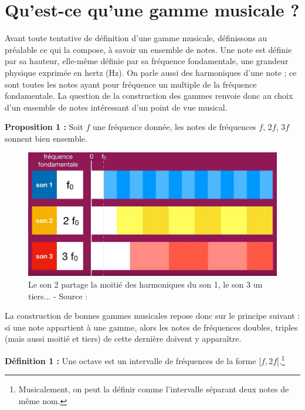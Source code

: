 \documentclass[moyen]{classeUPD}
\newenvironment{definition}{
	\begin{lrbox}{\tempbox}
		\begin{minipage}{\textwidth}
		}{
		\end{minipage}
	\end{lrbox}
	\begin{center}
		\fcolorbox[HTML]{222222}{EEEEEE}{
			\usebox{\tempbox}
		}
	\end{center}
}
\newcommand{\emf}[1]{\textbf{#1}}
\begin{document}
\chapter{Qu’est-ce qu’une gamme musicale ?}

Avant toute tentative de définition d’une gamme musicale, définissons au préalable ce qui la compose, à savoir un ensemble de notes. Une note est définie par sa hauteur, elle-même définie par sa fréquence fondamentale, une grandeur physique exprimée en hertz (Hz). On parle aussi des harmoniques d'une note ; ce sont toutes les notes ayant pour fréquence un multiple de la fréquence fondamentale. La question de la construction des gammes renvoie donc au choix d’un ensemble de notes intéressant d’un point de vue musical.
\begin{definition}
	\emf{Proposition 1 :} Soit $f$ une fréquence donnée, les notes de fréquences $f$, $2f$, $3f$ sonnent bien ensemble.\\
\end{definition}

\begin{figure}[h!]
	\begin{center}
		\includegraphics[width=0.6\textheight]{Notes2}
		\caption[Harmoniques et fondamentales...]{Le son 2 partage la moitié des harmoniques du son 1, le son 3 un tiers... - Source : \cite{cordierphychi_fractions_nodate}}
		\label{figure 1}
	\end{center}
\end{figure}

La construction de bonnes gammes musicales repose donc sur le principe suivant : si une note appartient à une gamme, alors les notes de fréquences doubles, triples (mais aussi moitié et tiers) de cette dernière doivent y apparaître.

\begin{definition}
	\emf{Définition 1 :} Une octave est un intervalle de fréquences de la forme $[f,2f[$.\footnote{Musicalement, on peut la définir comme l’intervalle séparant deux notes de même nom.}\\
\end{definition}
\end{document}
